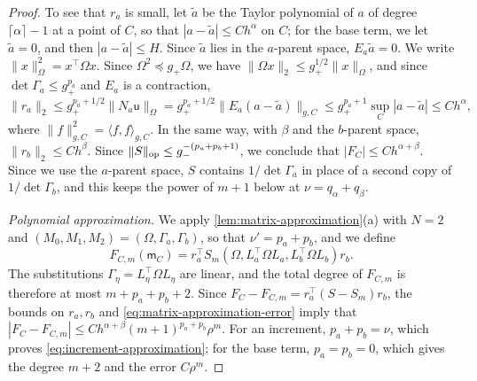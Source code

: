 \begin{proof}
To see that $r_a$ is small, let $\widetilde a$ be the Taylor polynomial of
$a$ of degree $\lceil\alpha\rceil-1$ at a point of $C$, so that
$|a-\widetilde a|\le Ch^\alpha$ on $C$; for the base term, we let
$\widetilde a=0$, and then $|a-\widetilde a|\le H$. Since $\widetilde a$
lies in the $a$-parent space, $E_a\widetilde a=0$. We write
$\|x\|_\Omega^2=x^\top\Omega x$. Since $\Omega^2\preceq g_+\Omega$, we have
$\|\Omega x\|_2\le g_+^{1/2}\|x\|_\Omega$, and since
$\det\Gamma_a\le g_+^{p_a}$ and $E_a$ is a contraction,
\[
 \|r_a\|_2\le g_+^{p_a+1/2}\|N_a\mathsf u\|_\Omega
 =g_+^{p_a+1/2}\|E_a(a-\widetilde a)\|_{g,C}
 \le g_+^{p_a+1}\sup_C|a-\widetilde a|\le Ch^\alpha,
\]
where $\|f\|_{g,C}^2=\langle f,f\rangle_{g,C}$. In the same way, with
$\beta$ and the $b$-parent space, $\|r_b\|_2\le Ch^\beta$. Since
$\|S\|_{\rm op}\le g_-^{-(p_a+p_b+1)}$, we conclude that
$|F_C|\le Ch^{\alpha+\beta}$. Since we use the $a$-parent space, $S$
contains $1/\det\Gamma_a$ in place of a second copy of
$1/\det\Gamma_b$, and this keeps the power of $m+1$ below at
$\nu=q_\alpha+q_\beta$.

\emph{Polynomial approximation.} We apply
\cref{lem:matrix-approximation}(a) with $N=2$ and
$(M_0,M_1,M_2)=(\Omega,\Gamma_a,\Gamma_b)$, so that $\nu'=p_a+p_b$, and we
define
\begin{equation}\label{eq:polynomial-increment}
 F_{C,m}(\mathsf m_C)=r_a^\top
 S_m(\Omega,L_a^\top\Omega L_a,L_b^\top\Omega L_b)r_b.
\end{equation}
The substitutions $\Gamma_\eta=L_\eta^\top\Omega L_\eta$ are linear, and
the total degree of $F_{C,m}$ is therefore at most $m+p_a+p_b+2$. Since
$F_C-F_{C,m}=r_a^\top(S-S_m)r_b$, the bounds on $r_a,r_b$ and
\eqref{eq:matrix-approximation-error} imply that
$|F_C-F_{C,m}|\le Ch^{\alpha+\beta}(m+1)^{p_a+p_b}\rho^m$. For an
increment, $p_a+p_b=\nu$, which proves \eqref{eq:increment-approximation};
for the base term, $p_a=p_b=0$, which gives the degree $m+2$ and the error
$C\rho^m$.


\end{proof}
